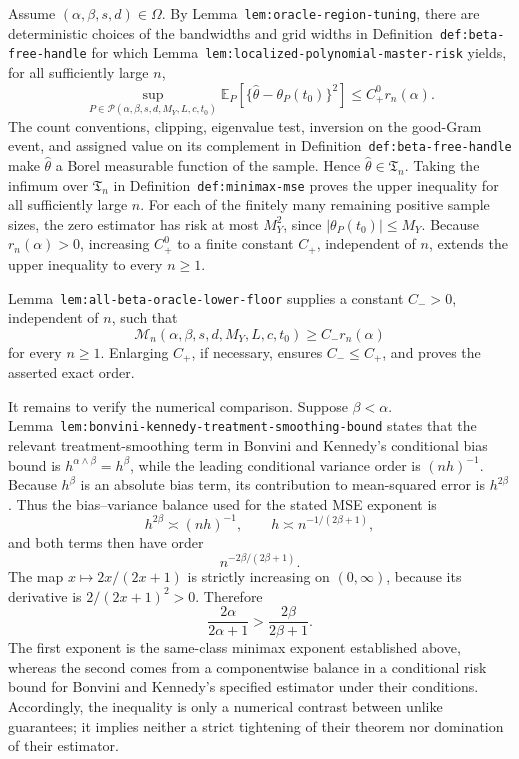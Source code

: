 Assume \((\alpha,\beta,s,d)\in\Omega\). By Lemma~\texttt{lem:oracle-region-tuning}, there are deterministic choices of the bandwidths and grid widths in Definition~\texttt{def:beta-free-handle} for which Lemma~\texttt{lem:localized-polynomial-master-risk} yields, for all sufficiently large \(n\),
\[
\sup_{P\in\mathcal P(\alpha,\beta,s,d,M_Y,L,c,t_0)}
\mathbb E_P\!\left[\{\widehat\theta-\theta_P(t_0)\}^2\right]
\le C_+^0 r_n(\alpha).
\]
The count conventions, clipping, eigenvalue test, inversion on the good-Gram event, and assigned value on its complement in Definition~\texttt{def:beta-free-handle} make \(\widehat\theta\) a Borel measurable function of the sample. Hence \(\widehat\theta\in\mathfrak T_n\). Taking the infimum over \(\mathfrak T_n\) in Definition~\texttt{def:minimax-mse} proves the upper inequality for all sufficiently large \(n\). For each of the finitely many remaining positive sample sizes, the zero estimator has risk at most \(M_Y^2\), since \(\lvert\theta_P(t_0)\rvert\le M_Y\). Because \(r_n(\alpha)>0\), increasing \(C_+^0\) to a finite constant \(C_+\), independent of \(n\), extends the upper inequality to every \(n\ge1\).

Lemma~\texttt{lem:all-beta-oracle-lower-floor} supplies a constant \(C_->0\), independent of \(n\), such that
\[
\mathcal M_n(\alpha,\beta,s,d,M_Y,L,c,t_0)
\ge C_- r_n(\alpha)
\]
for every \(n\ge1\). Enlarging \(C_+\), if necessary, ensures \(C_-\le C_+\), and proves the asserted exact order.

It remains to verify the numerical comparison. Suppose \(\beta<\alpha\). Lemma~\texttt{lem:bonvini-kennedy-treatment-smoothing-bound} states that the relevant treatment-smoothing term in Bonvini and Kennedy's conditional bias bound is \(h^{\alpha\wedge\beta}=h^\beta\), while the leading conditional variance order is \((nh)^{-1}\). Because \(h^\beta\) is an absolute bias term, its contribution to mean-squared error is \(h^{2\beta}\). Thus the bias--variance balance used for the stated MSE exponent is
\[
h^{2\beta}\asymp (nh)^{-1},
\qquad
h\asymp n^{-1/(2\beta+1)},
\]
and both terms then have order
\[
n^{-2\beta/(2\beta+1)}.
\]
The map \(x\mapsto 2x/(2x+1)\) is strictly increasing on \((0,\infty)\), because its derivative is \(2/(2x+1)^2>0\). Therefore
\[
\frac{2\alpha}{2\alpha+1}>
\frac{2\beta}{2\beta+1}.
\]
The first exponent is the same-class minimax exponent established above, whereas the second comes from a componentwise balance in a conditional risk bound for Bonvini and Kennedy's specified estimator under their conditions. Accordingly, the inequality is only a numerical contrast between unlike guarantees; it implies neither a strict tightening of their theorem nor domination of their estimator.